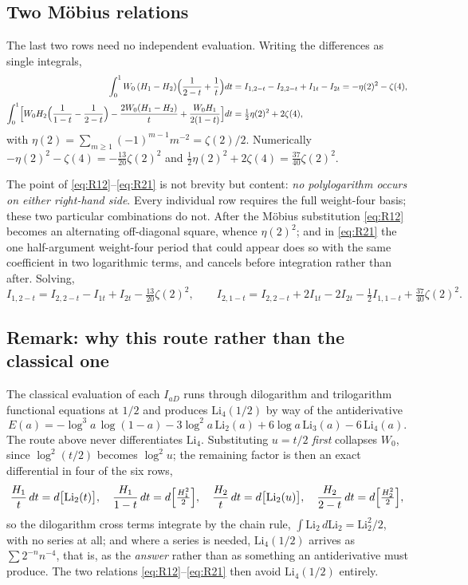 \documentclass[11pt]{article}
\begin{document}
\subsection{Two M\"obius relations}

The last two rows need no independent evaluation.  Writing the
differences as single integrals,
\begin{align}
\int_0^1 W_0\,(H_1 - H_2)\Bigl(\frac1{2-t} + \frac1t\Bigr) dt
  &= I_{1,2-t} - I_{2,2-t} + I_{1t} - I_{2t}
   = -\eta(2)^2 - \zeta(4), \label{eq:R12}\\[2pt]
\int_0^1 \Bigl[ W_0 H_2\Bigl(\frac1{1-t} - \frac1{2-t}\Bigr)
  - \frac{2W_0(H_1-H_2)}{t} + \frac{W_0 H_1}{2(1-t)}\Bigr] dt
  &= \tfrac12\eta(2)^2 + 2\zeta(4), \label{eq:R21}
\end{align}
with $\eta(2) = \sum_{m\ge1}(-1)^{m-1}m^{-2} = \zeta(2)/2$.  Numerically
$-\eta(2)^2 - \zeta(4) = -\tfrac{13}{20}\zeta(2)^2$ and
$\tfrac12\eta(2)^2 + 2\zeta(4) = \tfrac{37}{40}\zeta(2)^2$.

The point of \eqref{eq:R12}--\eqref{eq:R21} is not brevity but content:
\emph{no polylogarithm occurs on either right-hand side}.  Every
individual row requires the full weight-four basis; these two particular
combinations do not.  After the M\"obius substitution \eqref{eq:R12}
becomes an alternating off-diagonal square, whence $\eta(2)^2$; and in
\eqref{eq:R21} the one half-argument weight-four period that could appear
does so with the same coefficient in two logarithmic terms, and cancels
before integration rather than after.  Solving,
\[
I_{1,2-t} = I_{2,2-t} - I_{1t} + I_{2t} - \tfrac{13}{20}\zeta(2)^2,
\qquad
I_{2,1-t} = I_{2,2-t} + 2I_{1t} - 2I_{2t} - \tfrac12 I_{1,1-t}
            + \tfrac{37}{40}\zeta(2)^2.
\]

\subsection{Remark: why this route rather than the classical one}

The classical evaluation of each $I_{aD}$ runs through dilogarithm and
trilogarithm functional equations at $1/2$ and produces
$\mathrm{Li}_4(1/2)$ by way of the antiderivative
\[
E(a) = -\log^3\! a\,\log(1-a) - 3\log^2\! a\,\mathrm{Li}_2(a)
       + 6\log a\,\mathrm{Li}_3(a) - 6\,\mathrm{Li}_4(a).
\]
The route above never differentiates $\mathrm{Li}_4$.  Substituting
$u = t/2$ \emph{first} collapses $W_0$, since $\log^2(t/2)$ becomes
$\log^2 u$; the remaining factor is then an exact differential in four of
the six rows,
\[
\frac{H_1}{t}\,dt = d\bigl[\mathrm{Li}_2(t)\bigr],\quad
\frac{H_1}{1-t}\,dt = d\Bigl[\tfrac{H_1^2}{2}\Bigr],\quad
\frac{H_2}{t}\,dt = d\bigl[\mathrm{Li}_2(u)\bigr],\quad
\frac{H_2}{2-t}\,dt = d\Bigl[\tfrac{H_2^2}{2}\Bigr],
\]
so the dilogarithm cross terms integrate by the chain rule,
$\int \mathrm{Li}_2\,d\mathrm{Li}_2 = \mathrm{Li}_2^2/2$, with no series
at all; and where a series is needed, $\mathrm{Li}_4(1/2)$ arrives as
$\sum 2^{-n}n^{-4}$, that is, as the \emph{answer} rather than as
something an antiderivative must produce.  The two relations
\eqref{eq:R12}--\eqref{eq:R21} then avoid $\mathrm{Li}_4(1/2)$ entirely.
\end{document}
